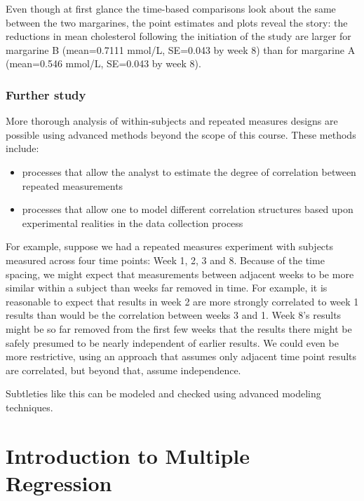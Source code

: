 \documentclass[
]{book}
\providecommand{\tightlist}{%
  \setlength{\itemsep}{0pt}\setlength{\parskip}{0pt}}
\begin{document}
Even though at first glance the time-based comparisons look about the same between the two margarines, the point estimates and plots reveal the story: the reductions in mean cholesterol following the initiation of the study are larger for margarine B (mean=0.7111 mmol/L, SE=0.043 by week 8) than for margarine A (mean=0.546 mmol/L, SE=0.043 by week 8).

\hypertarget{further-study}{%
\subsection{Further study}\label{further-study}}

More thorough analysis of within-subjects and repeated measures designs are possible using advanced methods beyond the scope of this course. These methods include:

\begin{itemize}
\tightlist
\item
  processes that allow the analyst to estimate the degree of correlation between repeated measurements
\item
  processes that allow one to model different correlation structures based upon experimental realities in the data collection process
\end{itemize}

For example, suppose we had a repeated measures experiment with subjects measured across four time points: Week 1, 2, 3 and 8. Because of the time spacing, we might expect that measurements between adjacent weeks to be more similar within a subject than weeks far removed in time. For example, it is reasonable to expect that results in week 2 are more strongly correlated to week 1 results than would be the correlation between weeks 3 and 1. Week 8's results might be so far removed from the first few weeks that the results there might be safely presumed to be nearly independent of earlier results. We could even be more restrictive, using an approach that assumes only adjacent time point results are correlated, but beyond that, assume independence.

Subtleties like this can be modeled and checked using advanced modeling techniques.

\hypertarget{introduction-to-multiple-regression}{%
\chapter{Introduction to Multiple Regression}\label{introduction-to-multiple-regression}}
\end{document}
